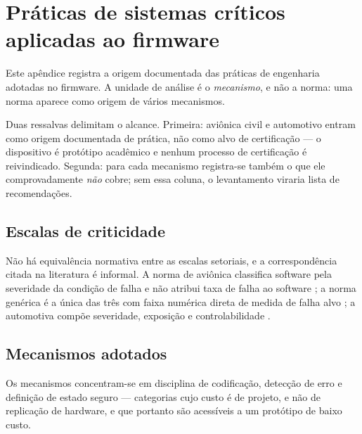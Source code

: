
\chapter{Práticas de sistemas críticos aplicadas ao firmware}
\label{ape:praticas}

Este apêndice registra a origem documentada das práticas de engenharia adotadas no
firmware. A unidade de análise é o \emph{mecanismo}, e não a norma: uma norma aparece como
origem de vários mecanismos.

Duas ressalvas delimitam o alcance. Primeira: aviônica civil e automotivo entram como
origem documentada de prática, não como alvo de certificação --- o dispositivo é protótipo
acadêmico e nenhum processo de certificação é reivindicado. Segunda: para cada mecanismo
registra-se também o que ele comprovadamente \emph{não} cobre; sem essa coluna, o
levantamento viraria lista de recomendações.

\section{Escalas de criticidade}
\label{sec:ape-escalas}

Não há equivalência normativa entre as escalas setoriais, e a correspondência citada na
literatura é informal. A norma de aviônica classifica software pela severidade da condição
de falha e não atribui taxa de falha ao software \cite{do178c}; a norma genérica é a única
das três com faixa numérica direta de medida de falha alvo \cite{iec61508}; a automotiva
compõe severidade, exposição e controlabilidade \cite{iso26262}.

\section{Mecanismos adotados}
\label{sec:ape-mecanismos}

Os mecanismos concentram-se em disciplina de codificação, detecção de erro e definição de
estado seguro --- categorias cujo custo é de projeto, e não de replicação de hardware, e
que portanto são acessíveis a um protótipo de baixo custo.

